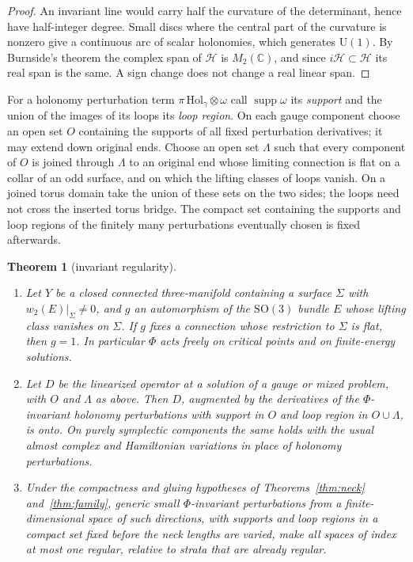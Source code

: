 \documentclass[11pt]{amsart}
\newtheorem{theorem}{Theorem}[section]
\theoremstyle{definition}
\theoremstyle{remark}
\theoremstyle{plain}
\numberwithin{equation}{section}
\newcommand{\CC}{\mathbb{C}}
\newcommand{\SO}{\mathrm{SO}}
\newcommand{\U}{\mathrm{U}}
\begin{document}
\begin{proof}
An invariant line would carry half the curvature of the determinant,
hence have half-integer degree. Small discs where the central part of
the curvature is nonzero give a continuous arc of scalar holonomies,
which generates $\U(1)$. By Burnside's theorem the complex span of
$\mathcal H$ is $M_2(\CC)$, and since $i\mathcal H\subset\mathcal H$ its
real span is the same. A sign change does not change a real linear span.
\end{proof}

For a holonomy perturbation term $\pi\,\mathrm{Hol}_\gamma\otimes\omega$ call
$\operatorname{supp}\omega$ its \emph{support} and the union of the images of its loops its
\emph{loop region}. On each gauge component choose an open set $O$ containing the supports
of all fixed perturbation derivatives; it may extend down original ends. Choose an open
set $\Lambda$ such that every component of $O$ is joined through $\Lambda$ to an original
end whose limiting connection is flat on a collar of an odd surface, and on which the
lifting classes of loops vanish. On a joined torus domain take the union of these sets on
the two sides; the loops need not cross the inserted torus bridge. The compact set
containing the supports and loop regions of the finitely many perturbations eventually
chosen is fixed afterwards.

\begin{theorem}[invariant regularity]\label{thm:regularity}
\begin{enumerate}[label=(\roman*)]
\item Let $Y$ be a closed connected three-manifold containing a surface
  $\Sigma$ with $w_2(E)|_\Sigma\ne0$, and $g$ an automorphism of the
  $\SO(3)$ bundle $E$ whose lifting class vanishes on $\Sigma$. If
  $g$ fixes a connection whose restriction to $\Sigma$ is flat, then
  $g=1$. In particular $\Phi$ acts freely on critical points and on
  finite-energy solutions.
\item Let $D$ be the linearized operator at a solution of a gauge or mixed problem,
  with $O$ and $\Lambda$ as above. Then $D$, augmented by the derivatives of the
  $\Phi$-invariant holonomy perturbations with support in $O$ and loop region in
  $O\cup\Lambda$, is onto. On purely symplectic components the same holds with the usual
  almost complex and Hamiltonian variations in place of holonomy perturbations.
\item Under the compactness and gluing hypotheses of
  Theorems~\ref{thm:neck} and~\ref{thm:family}, generic small $\Phi$-invariant
  perturbations from a finite-dimensional space of such directions, with supports and loop
  regions in a compact set fixed before the neck lengths are varied, make all spaces of
  index at most one regular, relative to strata that are already regular.
\end{enumerate}
\end{theorem}
\end{document}
